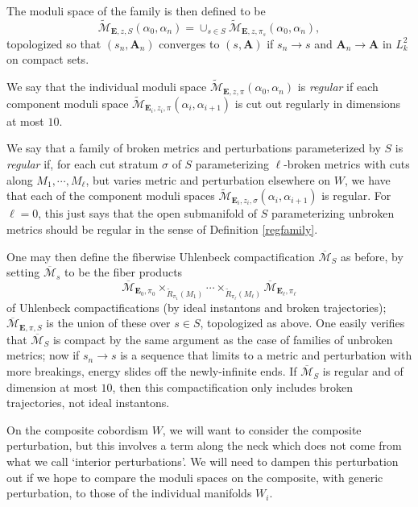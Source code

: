 \documentclass[10pt,a4paper]{amsart}
\theoremstyle{definition}
\theoremstyle{remark}
\numberwithin{figure}{qchap}
\begin{document}
The moduli space of the family is then defined to be $$\widetilde{\mathcal M}_{\mathbf{E},z,S}(\alpha_0, \alpha_n) = \cup_{s \in S} \widetilde{\mathcal M}_{\mathbf{E},z,\pi_s}(\alpha_0, \alpha_n),$$ topologized so that $(s_n, \mathbf{A}_n)$ converges to $(s,\mathbf{A})$ if $s_n \to s$ and $\mathbf{A}_n \to \mathbf{A}$ in $L^2_k$ on compact sets.

We say that the individual moduli space $\widetilde{\mathcal M}_{\mathbf{E},z,\pi}(\alpha_0, \alpha_n)$ is \emph{regular} if each component moduli space $\widetilde{\mathcal M}_{\mathbf{E}_i,z_i,\pi}(\alpha_i, \alpha_{i+1})$ is cut out regularly in dimensions at most $10$.

We say that a family of broken metrics and perturbations parameterized by $S$ is \emph{regular} if, for each cut stratum $\sigma$ of $S$ parameterizing $\ell$-broken metrics with cuts along $M_1, \cdots, M_\ell$, but varies metric and perturbation elsewhere on $W$, we have that each of the component moduli spaces $\widetilde{\mathcal M}_{\mathbf{E}_i,z_i,\sigma}(\alpha_i, \alpha_{i+1})$ is regular. For $\ell = 0$, this just says that the open submanifold of $S$ parameterizing unbroken metrics should be regular in the sense of Definition \ref{regfamily}.

One may then define the fiberwise Uhlenbeck compactification $\overline{\mathcal M}_S$ as before, by setting $\overline{\mathcal M}_s$ to be the fiber products $$\overline{\mathcal M}_{\mathbf{E}_0,\pi_0} \times_{\widetilde R_{\pi_1}(M_1)} \cdots \times_{\widetilde R_{\pi_\ell}(M_\ell)} \overline{\mathcal M}_{\mathbf{E}_\ell,\pi_\ell}$$ of Uhlenbeck compactifications (by ideal instantons and broken trajectories); $\overline{\mathcal M}_{\mathbf{E},\pi,S}$ is the union of these over $s \in S$, topologized as above. One easily verifies that $\overline{\mathcal M}_S$ is compact by the same argument as the case of families of unbroken metrics; now if $s_n \to s$ is a sequence that limits to a metric and perturbation with more breakings, energy slides off the newly-infinite ends. If $\overline{\mathcal M}_S$ is regular and of dimension at most $10$, then this compactification only includes broken trajectories, not ideal instantons.

On the composite cobordism $W$, we will want to consider the composite perturbation, but this involves a term along the neck which does not come from what we call `interior perturbations'. We will need to dampen this perturbation out if we hope to compare the moduli spaces on the composite, with generic perturbation, to those of the individual manifolds $W_i$.
\end{document}
